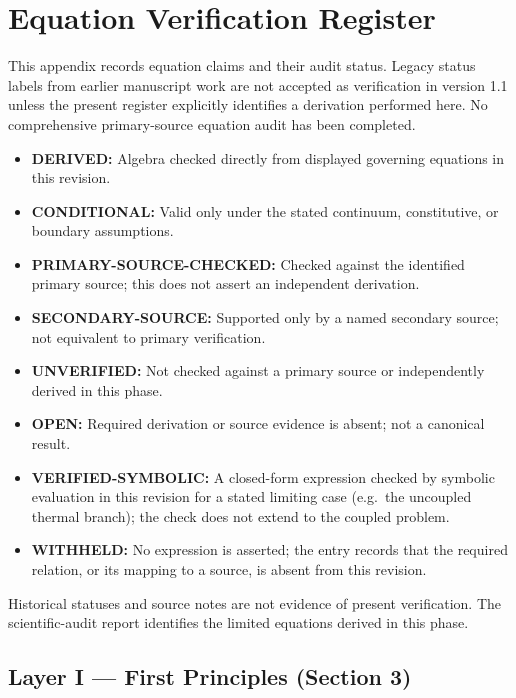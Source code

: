 \section{Equation Verification Register}
\label{app:equation_register}

This appendix records equation claims and their audit status. Legacy status labels from earlier manuscript work are not accepted as verification in version 1.1 unless the present register explicitly identifies a derivation performed here. No comprehensive primary-source equation audit has been completed.

\begin{itemize}
\item \textbf{DERIVED:} Algebra checked directly from displayed governing equations in this revision.
\item \textbf{CONDITIONAL:} Valid only under the stated continuum, constitutive, or boundary assumptions.
\item \textbf{PRIMARY-SOURCE-CHECKED:} Checked against the identified primary source; this does not assert an independent derivation.
\item \textbf{SECONDARY-SOURCE:} Supported only by a named secondary source; not equivalent to primary verification.
\item \textbf{UNVERIFIED:} Not checked against a primary source or independently derived in this phase.
\item \textbf{OPEN:} Required derivation or source evidence is absent; not a canonical result.
\item \textbf{VERIFIED-SYMBOLIC:} A closed-form expression checked by symbolic evaluation in this revision for a stated limiting case (e.g.\ the uncoupled thermal branch); the check does not extend to the coupled problem.
\item \textbf{WITHHELD:} No expression is asserted; the entry records that the required relation, or its mapping to a source, is absent from this revision.
\end{itemize}

Historical statuses and source notes are not evidence of present verification. The scientific-audit report identifies the limited equations derived in this phase.

\subsection{Layer I — First Principles (Section 3)}

